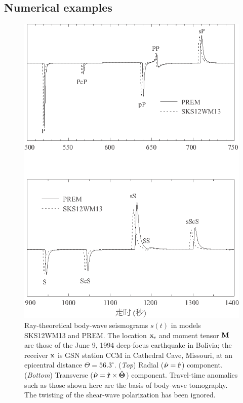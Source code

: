 \subsection{Numerical examples}

\begin{figure}[!t]
\begin{center}
\includegraphics{../figures/chap15/fig09.eps}
\end{center}
\caption[ray theory seismograms]
{\label{15.fig.LTfig4}
Ray-theoretical body-wave seismograms $s(t)$ in models SKS12WM13
and PREM.  The location ${\bf x}_{\rm s}$ and moment tensor
${\bf M}$ are those of the June 9, 1994 deep-focus earthquake
in Bolivia; the receiver ${\bf x}$ is GSN station CCM in Cathedral
Cave, Missouri, at an epicentral distance $\Theta=56.3^{\circ}$.
({\em Top\/}) Radial ($\hat{\mbox{\boldmath $\nu$}}=\hat{\bf r}$)
component.  ({\em Bottom\/}) Transverse ($\hat{\mbox{\boldmath $\nu$}}
=\hat{\bf r}\times\hat{\bf\Theta}$) component.
Travel-time anomalies such as those shown here are the basis
of body-wave tomography.  The twisting of the shear-wave
%
%
polarization has been ignored.
}
\end{figure}
